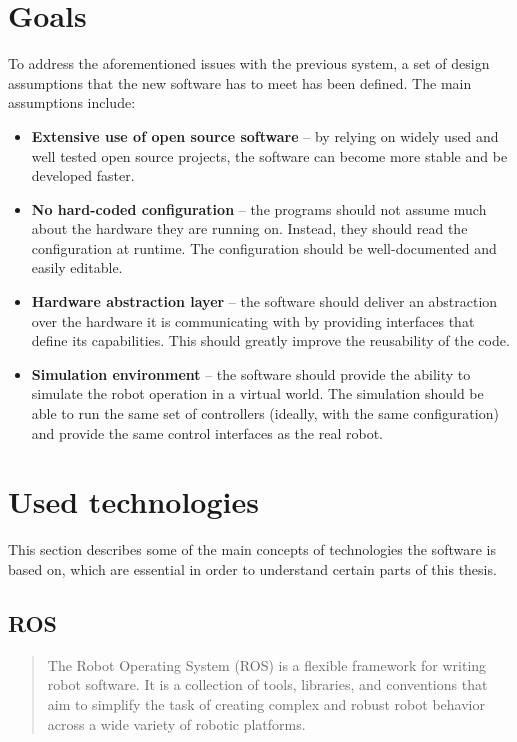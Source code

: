 \documentclass[english,inz,shortabstract]{iithesis}
\begin{document}
\section{Goals}
To address the aforementioned issues with the previous system, a set of design assumptions that the new software has to meet has been defined. The main assumptions include:

\begin{itemize}
	\item \textbf{Extensive use of open source software} -- by relying on widely used and well tested open source projects, the software can become more stable and be developed faster.
	\item \textbf{No hard-coded configuration} -- the programs should not assume much about the hardware they are running on. Instead, they should read the configuration at runtime. The configuration should be well-documented and easily editable.
	\item \textbf{Hardware abstraction layer} -- the software should deliver an abstraction over the hardware it is communicating with by providing interfaces that define its capabilities. This should greatly improve the reusability of the code. 
	\item \textbf{Simulation environment} -- the software should provide the ability to simulate the robot operation in a virtual world. The simulation should be able to run the same set of controllers (ideally, with the same configuration) and provide the same control interfaces as the real robot.
\end{itemize}


\section{Used technologies}
This section describes some of the main concepts of technologies the software is based on, which are essential in order to understand certain parts of this thesis.

	\subsection{ROS}
	\begin{quote}
		The Robot Operating System (ROS) is a flexible framework for writing robot software. It is a collection of tools, libraries, and conventions that aim to simplify the task of creating complex and robust robot behavior across a wide variety of robotic platforms.
		\cite{ros:about}
	\end{quote}
\end{document}
